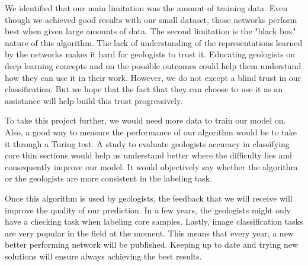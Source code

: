 We identified that our main limitation was the amount of training data. Even though we achieved good results with our small dataset, those networks perform best when given large amounts of data. The second limitation is the "black box" nature of this algorithm. The lack of understanding of the representations learned by the networks makes it hard for geologists to trust it. Educating geologists on deep learning concepts and on the possible outcomes could help them understand how they can use it in their work. However, we do not except a blind trust in our classification. But we hope that the fact that they can choose to use it as an assistance will help build this trust progressively. 


To take this project further, we would need more data to train our model on. Also, a good way to measure the performance of our algorithm would be to take it through a Turing test. A study to evaluate geologists accuracy in classifying core thin sections would help us understand better where the difficulty lies and consequently improve our model. It would objectively say whether the algorithm or the geologists are more consistent in the labeling task. 

Once this algorithm is used by geologists, the feedback that we will receive will improve the quality of our prediction. In a few years, the geologists might only have a checking task when labeling core samples. Lastly, image classification tasks are very popular in the field at the moment. This means that every year, a new better performing network will be published. Keeping up to date and trying new solutions will ensure always achieving the best results. 
